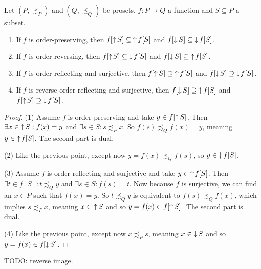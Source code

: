 \begin{lemma}
Let $(P, \precsim_P)$ and $(Q, \precsim_Q)$ be prosets, $f: P\to Q$ a function and $S\subseteq P$ a subset.
\begin{enumerate}
\item If $f$ is order-preserving, then $f[\mathop{\uparrow} S] \subseteq \mathop{\uparrow} f[S]$ and $f[\mathop{\downarrow} S] \subseteq \mathop{\downarrow} f[S]$.
\item If $f$ is order-reversing, then $f[\mathop{\uparrow} S] \subseteq \mathop{\downarrow} f[S]$ and $f[\mathop{\downarrow} S] \subseteq \mathop{\uparrow} f[S]$.
\item If $f$ is order-reflecting and surjective, then $f[\mathop{\uparrow} S] \supseteq \mathop{\uparrow} f[S]$ and $f[\mathop{\downarrow} S] \supseteq \mathop{\downarrow} f[S]$.
\item If $f$ is reverse order-reflecting and surjective, then $f[\mathop{\downarrow} S] \supseteq \mathop{\uparrow} f[S]$ and $f[\mathop{\uparrow} S] \supseteq \mathop{\downarrow} f[S]$.
\end{enumerate}
\end{lemma}
\begin{proof}
(1) Assume $f$ is order-preserving and take $y\in f[\mathop{\uparrow} S]$. Then $\exists x\in \mathop{\uparrow} S: f(x) = y$ and $\exists s\in S: s\precsim_P x$. So $f(s) \precsim_Q f(x) = y$, meaning $y\in \mathop{\uparrow} f[S]$. The second part is dual.

(2) Like the previous point, except now $y = f(x) \precsim_Q f(s)$, so $y \in \mathop{\downarrow} f[S]$.

(3) Assume $f$ is order-reflecting and surjective and take $y\in \mathop{\uparrow} f[S]$. Then $\exists t\in f[S]: t \precsim_Q y$ and $\exists s\in S: f(s) = t$. Now because $f$ is surjective, we can find an $x\in P$ such that $f(x) = y$. So $t \precsim_Q y$ is equivalent to $f(s) \precsim_Q f(x)$, which implies $s \precsim_P x$, meaning $x\in \mathop{\uparrow} S$ and so $y = f(x) \in f[\mathop{\uparrow} S]$. The second part is dual.

(4) Like the previous point, except now $x\precsim_P s$, meaning $x\in \mathop{\downarrow} S$ and so $y = f(x) \in f[\mathop{\downarrow} S]$.
\end{proof}
TODO: reverse image.
